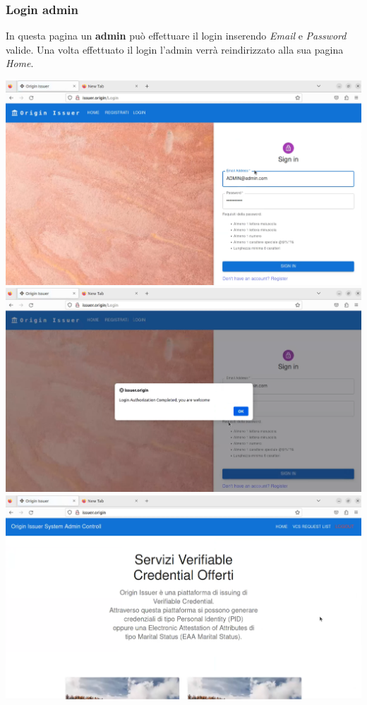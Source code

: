 \subsubsection{Login admin}
In questa pagina un \textbf{admin} può effettuare il login inserendo \textit{Email} e \textit{Password} valide. Una volta effettuato il login l'admin verrà reindirizzato alla sua pagina \textit{Home}.
\begin{center}
\includegraphics[scale = 0.2]{./res/img/issuer/new/loginadmin1.png}
\includegraphics[scale = 0.2]{./res/img/issuer/new/loginadmin2.png}
\includegraphics[scale = 0.2]{./res/img/issuer/new/loginadmin3.png}
\end{center}

